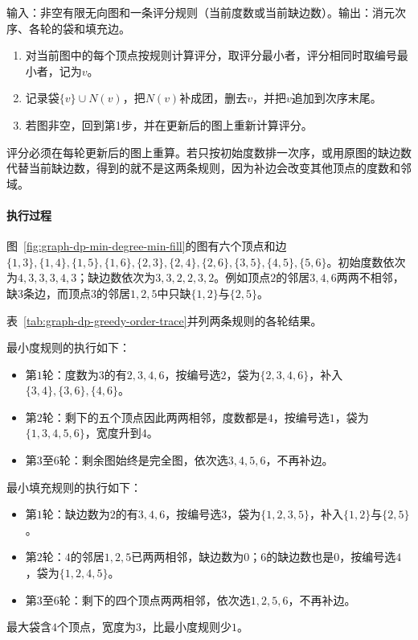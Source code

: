 \begin{algorithm}[贪心选择消元次序]
\label{alg:graph-dp-greedy-order}
输入：非空有限无向图和一条评分规则（当前度数或当前缺边数）。输出：消元次序、各轮的袋和填充边。
\begin{enumerate}
  \item 对当前图中的每个顶点按规则计算评分，取评分最小者，评分相同时取编号最小者，记为$v$。
  \item 记录袋$\{v\}\cup N(v)$，把$N(v)$补成团，删去$v$，并把$v$追加到次序末尾。
  \item 若图非空，回到第1步，并在更新后的图上重新计算评分。
\end{enumerate}
\end{algorithm}

评分必须在每轮更新后的图上重算。若只按初始度数排一次序，或用原图的缺边数代替当前缺边数，得到的就不是这两条规则，因为补边会改变其他顶点的度数和邻域。

\paragraph{执行过程}
图~\ref{fig:graph-dp-min-degree-min-fill}的图有六个顶点和边$\{1,3\},\allowbreak\{1,4\},\allowbreak\{1,5\},\allowbreak\{1,6\},\allowbreak\{2,3\},\allowbreak\{2,4\},\allowbreak\{2,6\},\allowbreak\{3,5\},\allowbreak\{4,5\},\allowbreak\{5,6\}$。初始度数依次为$4,3,3,3,4,3$；缺边数依次为$3,3,2,2,3,2$。例如顶点$2$的邻居$3,4,6$两两不相邻，缺$3$条边，而顶点$3$的邻居$1,2,5$中只缺$\{1,2\}$与$\{2,5\}$。

表~\ref{tab:graph-dp-greedy-order-trace}并列两条规则的各轮结果。

最小度规则的执行如下：
\begin{itemize}
  \item 第$1$轮：度数为$3$的有$2,3,4,6$，按编号选$2$，袋为$\{2,3,4,6\}$，补入$\{3,4\},\allowbreak\{3,6\},\allowbreak\{4,6\}$。
  \item 第$2$轮：剩下的五个顶点因此两两相邻，度数都是$4$，按编号选$1$，袋为$\{1,3,4,5,6\}$，宽度升到$4$。
  \item 第$3$至$6$轮：剩余图始终是完全图，依次选$3,4,5,6$，不再补边。
\end{itemize}
最小填充规则的执行如下：
\begin{itemize}
  \item 第$1$轮：缺边数为$2$的有$3,4,6$，按编号选$3$，袋为$\{1,2,3,5\}$，补入$\{1,2\}$与$\{2,5\}$。
  \item 第$2$轮：$4$的邻居$1,2,5$已两两相邻，缺边数为$0$；$6$的缺边数也是$0$，按编号选$4$，袋为$\{1,2,4,5\}$。
  \item 第$3$至$6$轮：剩下的四个顶点两两相邻，依次选$1,2,5,6$，不再补边。
\end{itemize}
最大袋含$4$个顶点，宽度为$3$，比最小度规则少$1$。


